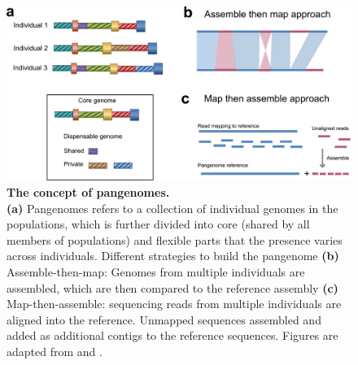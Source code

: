 \documentclass[../main.tex]{subfiles}
\begin{document}
\begin{figure}[!htb]
    \centering
    \includegraphics[width=\textwidth]{intro/fig3.pdf}
        \vspace{3mm}
        \caption[The concept of pangenomes]{\textbf{The concept of pangenomes.} \\
        \footnotesize{\textbf{(a)} Pangenomes refers to a collection of individual genomes in the populations, which is further divided into core (shared by all members of populations) and flexible parts that the presence varies across individuals. Different strategies to build the pangenome \textbf{(b)} Assemble-then-map: Genomes from multiple individuals are assembled, which are then compared to the reference assembly \textbf{(c)} Map-then-assemble: sequencing reads from multiple individuals are aligned into the reference. Unmapped sequences assembled and added as additional contigs to the reference sequences. Figures are adapted from \citep{sherman2020pan} and \citep{bayer2020plant}.}}
        \label{fig13:pan}
\end{figure}
\end{document}

